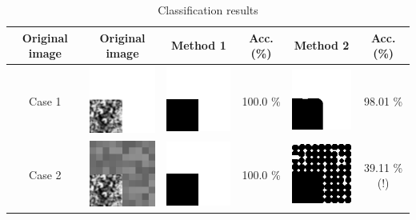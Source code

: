 \documentclass[11pt,twocolumn]{article}
\begin{document}
\begin{table}[ht]

\caption{Classification results}\label{resulttable}
\centering
\begin{tabular}{c|c|cc|cc}
\textbf{Original image} & \textbf{Original image} & \textbf{Method 1} & \textbf{Acc. (\%)} & \textbf{Method 2} & \textbf{Acc. (\%)} \\
\hline
Case 1 & \includegraphics[scale=1]{level01.png} & \includegraphics[scale=1]{level01_method1.png} & 100.0 \% & \includegraphics[scale=1]{level01_method2.png} & 98.01 \% \\
\hline
Case 2 & \includegraphics[scale=1]{level02.png} & \includegraphics[scale=1]{level02_method1.png} & 100.0 \% & \includegraphics[scale=1]{level02_method2.png} & 39.11 \% (!)\\

\end{tabular}
\end{table}
\end{document}
